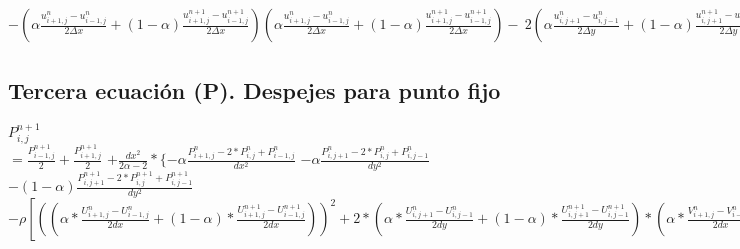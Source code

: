 \documentclass[a4paper]{article}
\begin{document}
$- \left( \alpha \frac{u_{i+1,j}^{n}-u_{i-1,j}^{n}}{2\Delta x} + (1-\alpha) \frac{u_{i+1,j}^{n+1}-u_{i-1,j}^{n+1}}{2\Delta x} \right) \left( \alpha \frac{u_{i+1,j}^{n}-u_{i-1,j}^{n}}{2\Delta x} + (1-\alpha) \frac{u_{i+1,j}^{n+1}-u_{i-1,j}^{n+1}}{2\Delta x} \right)
-  \ 2 \left( \alpha\frac{u_{i,j+1}^{n}-u_{i,j-1}^{n}}{2\Delta y} + (1-\alpha) \frac{u_{i,j+1}^{n+1}-u_{i,j-1}^{n+1}}{2\Delta y} \right) \left( \alpha\frac{v_{i+1,j}^{n}-v_{i-1,j}^{n}}{2\Delta x} + (1-\alpha) \frac{v_{i+1,j}^{n+1}-v_{i-1,j}^{n+1}}{2\Delta x} \right)
-\left. \left( \alpha\frac{v_{i,j+1}^{n}-v_{i,j-1}^{n}}{2\Delta y} + (1-\alpha) \frac{v_{i,j+1}^{n+1}-v_{i,j-1}^{n+1}}{2\Delta y} \right) \left( \alpha\frac{v_{i,j+1}^{n}-v_{i,j-1}^{n}}{2\Delta y} + (1-\alpha) \frac{v_{i,j+1}^{n+1}-v_{i,j-1}^{n+1}}{2\Delta y} \right)  \right] $


\subsection{Tercera ecuación (P). Despejes para punto fijo}
 
 $ P^{n+1}_{i,j} $
\\
$= \frac{P^{n+1}_{i-1,j}}{2} + \frac{P^{n+1}_{i+1,j}}{2} $
 $ + \frac{dx^{2}}{2\alpha-2} * \{-\alpha \frac{P^{n}_{i+1,j} -2*P^{n}_{i,j} + P^{n}_{i-1,j}}{dx^{2}}$
 $ -\alpha \frac{P^{n}_{i,j+1} -2*P^{n}_{i,j} + P^{n}_{i,j-1}}{dy^{2}}$ 
 $-(1-\alpha) \frac{P^{n+1}_{i,j+1} -2*P^{n+1}_{i,j} + P^{n+1}_{i,j-1}}{dy^{2}}$
 $ -\rho [ ((\alpha * \frac{U^{n}_{i+1,j} - U^{n}_{i-1,j}}{2dx} + (1-\alpha) * \frac{U^{n+1}_{i+1,j} - U^{n+1}_{i-1,j}}{2dx}))^{2} + 2 * (\alpha * \frac{U^{n}_{i,j+1} - U^{n}_{i,j-1}}{2dy} + (1- \alpha) * \frac{U^{n+1}_{i,j+1} - U^{n+1}_{i,j-1}}{2dy}) * (\alpha * \frac{V^{n}_{i+1,j}-V^{n}_{i-1,j}}{2dx} + (1-\alpha) (\frac{V^{n+1}_{i+1,j}-V^{n+1}_{i-1,j}}{2dx})) + ((\alpha * \frac{V^{n}_{i,j+1} - V^{n}_{i,j-1}}{2dy} + (1-\alpha) * \frac{V^{n+1}_{i,j+1} - V^{n+1}_{i,j-1}}{2dy}))^{2}] \} $
 
 
\end{document}
